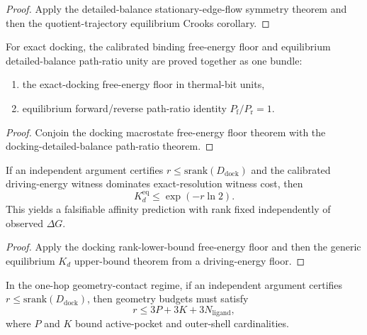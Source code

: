 \begin{proof}
Apply the detailed-balance stationary-edge-flow symmetry theorem and then the quotient-trajectory equilibrium Crooks corollary.
\end{proof}

\begin{theorem}\label{thm:md-resolver-free-equilibrium-bundle}
For exact docking, the calibrated binding free-energy floor and equilibrium detailed-balance path-ratio unity are proved together as one bundle:
\begin{enumerate}
\item the exact-docking free-energy floor in thermal-bit units,
\item equilibrium forward/reverse path-ratio identity $P_{\mathrm f}/P_{\mathrm r}=1$.
\end{enumerate}
\end{theorem}

\begin{proof}
Conjoin the docking macrostate free-energy floor theorem with the docking-detailed-balance path-ratio theorem.
\end{proof}

\begin{theorem}\label{thm:md-equilibrium-kd-prediction-from-rank-lb}
If an independent argument certifies $r \le \mathrm{srank}(D_{\mathrm{dock}})$ and the calibrated driving-energy witness dominates exact-resolution witness cost, then
\[
K_d^{\mathrm{eq}} \le \exp(-r\ln 2).
\]
This yields a falsifiable affinity prediction with rank fixed independently of observed $\Delta G$.
\end{theorem}

\begin{proof}
Apply the docking rank-lower-bound free-energy floor and then the generic equilibrium $K_d$ upper-bound theorem from a driving-energy floor.
\end{proof}

\begin{theorem}\label{thm:md-necessary-contact-shell-budget-from-rank-lb}
In the one-hop geometry-contact regime, if an independent argument certifies
\(
r \le \mathrm{srank}(D_{\mathrm{dock}})
\),
then geometry budgets must satisfy
\[
r \le 3P + 3K + 3N_{\mathrm{ligand}},
\]
where $P$ and $K$ bound active-pocket and outer-shell cardinalities.
\end{theorem}

